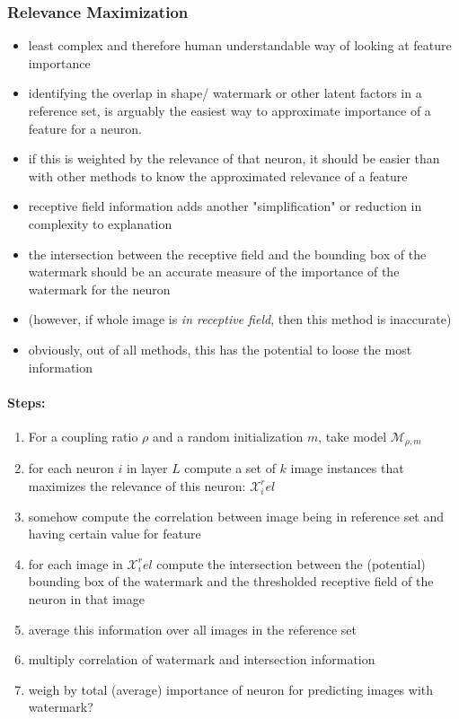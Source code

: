 \subsubsection{Relevance Maximization}
\begin{itemize}
    \item least complex and therefore human understandable way of looking at feature importance
    \item identifying the overlap in shape/ watermark or other latent factors in a reference set, is arguably the easiest way to approximate importance of a feature for a neuron.
    \item if this is weighted by the relevance of that neuron, it should be easier than with other methods to know the approximated relevance of a feature
    \item receptive field information adds another "simplification" or reduction in complexity to explanation
    \item the intersection between the receptive field and the bounding box of the watermark should be an accurate measure of the importance of the watermark for the neuron
    \item (however, if whole image is \textit{in receptive field}, then this method is inaccurate)
    \item obviously, out of all methods, this has the potential to loose the most information
\end{itemize}

\paragraph{Steps:}
\begin{enumerate}
    \item For a coupling ratio $\rho$ and a random initialization $m$, take model $\mathcal{M}_{\rho, m}$
    \item for each neuron $i$ in layer $L$ compute a set of $k$ image instances that maximizes the relevance of this neuron: $\mathcal{X}_{i}^rel$ 
    \item somehow compute the correlation between image being in reference set and having certain value for feature 
    \item for each image in $\mathcal{X}_{i}^rel$ compute the intersection between the (potential) bounding box of the watermark and the thresholded receptive field of the neuron in that image
    \item average this information over all images in the reference set
    \item multiply correlation of watermark and intersection information
    \item weigh by total (average) importance of neuron for predicting images with watermark? 
\end{enumerate}


